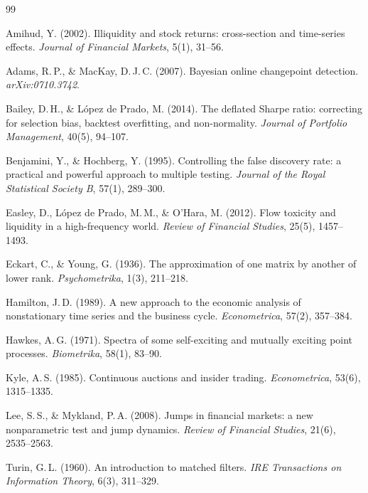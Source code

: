 \documentclass[11pt]{article}
\begin{document}
\begin{thebibliography}{99}

 Amihud, Y. (2002). Illiquidity and stock returns: cross-section and
  time-series effects. \emph{Journal of Financial Markets}, 5(1), 31--56.

 Adams, R.\,P., \& MacKay, D.\,J.\,C. (2007). Bayesian online changepoint
  detection. \emph{arXiv:0710.3742}.

 Bailey, D.\,H., \& L\'opez de Prado, M. (2014). The deflated Sharpe
  ratio: correcting for selection bias, backtest overfitting, and non-normality.
  \emph{Journal of Portfolio Management}, 40(5), 94--107.

 Benjamini, Y., \& Hochberg, Y. (1995). Controlling the false discovery
  rate: a practical and powerful approach to multiple testing.
  \emph{Journal of the Royal Statistical Society B}, 57(1), 289--300.

 Easley, D., L\'opez de Prado, M.\,M., \& O'Hara, M. (2012). Flow
  toxicity and liquidity in a high-frequency world.
  \emph{Review of Financial Studies}, 25(5), 1457--1493.

 Eckart, C., \& Young, G. (1936). The approximation of one matrix by
  another of lower rank. \emph{Psychometrika}, 1(3), 211--218.

 Hamilton, J.\,D. (1989). A new approach to the economic analysis of
  nonstationary time series and the business cycle. \emph{Econometrica}, 57(2), 357--384.

 Hawkes, A.\,G. (1971). Spectra of some self-exciting and mutually
  exciting point processes. \emph{Biometrika}, 58(1), 83--90.

 Kyle, A.\,S. (1985). Continuous auctions and insider trading.
  \emph{Econometrica}, 53(6), 1315--1335.

 Lee, S.\,S., \& Mykland, P.\,A. (2008). Jumps in financial markets: a new
  nonparametric test and jump dynamics.
  \emph{Review of Financial Studies}, 21(6), 2535--2563.

 Turin, G.\,L. (1960). An introduction to matched filters.
  \emph{IRE Transactions on Information Theory}, 6(3), 311--329.

\end{thebibliography}
\end{document}
